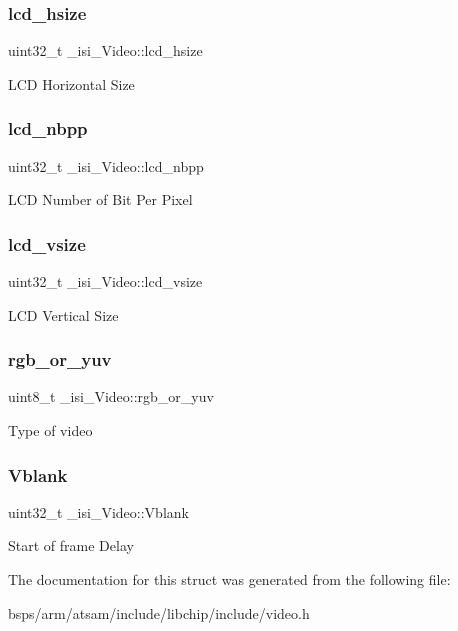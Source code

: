 \subsubsection{\texorpdfstring{lcd\_hsize}{lcd\_hsize}}
{\footnotesize\ttfamily uint32\+\_\+t \+\_\+isi\+\_\+\+Video\+::lcd\+\_\+hsize}

L\+CD Horizontal Size \mbox{\label{struct__isi__Video_ab9a6a44e8a044f701ac5dbd692d595a2}} 
\subsubsection{\texorpdfstring{lcd\_nbpp}{lcd\_nbpp}}
{\footnotesize\ttfamily uint32\+\_\+t \+\_\+isi\+\_\+\+Video\+::lcd\+\_\+nbpp}

L\+CD Number of Bit Per Pixel \mbox{\label{struct__isi__Video_a98ae06a9f22bd87bb661642bbab03cc6}} 
\subsubsection{\texorpdfstring{lcd\_vsize}{lcd\_vsize}}
{\footnotesize\ttfamily uint32\+\_\+t \+\_\+isi\+\_\+\+Video\+::lcd\+\_\+vsize}

L\+CD Vertical Size \mbox{\label{struct__isi__Video_ac6b940dc25ba87381788ccfa65b08ec8}} 
\subsubsection{\texorpdfstring{rgb\_or\_yuv}{rgb\_or\_yuv}}
{\footnotesize\ttfamily uint8\+\_\+t \+\_\+isi\+\_\+\+Video\+::rgb\+\_\+or\+\_\+yuv}

Type of video \mbox{\label{struct__isi__Video_a5076a63d3b0a19868542ff638c747c4e}} 
\subsubsection{\texorpdfstring{Vblank}{Vblank}}
{\footnotesize\ttfamily uint32\+\_\+t \+\_\+isi\+\_\+\+Video\+::\+Vblank}

Start of frame Delay 

The documentation for this struct was generated from the following file\+:\begin{DoxyCompactItemize}
\item 
bsps/arm/atsam/include/libchip/include/video.\+h\end{DoxyCompactItemize}
